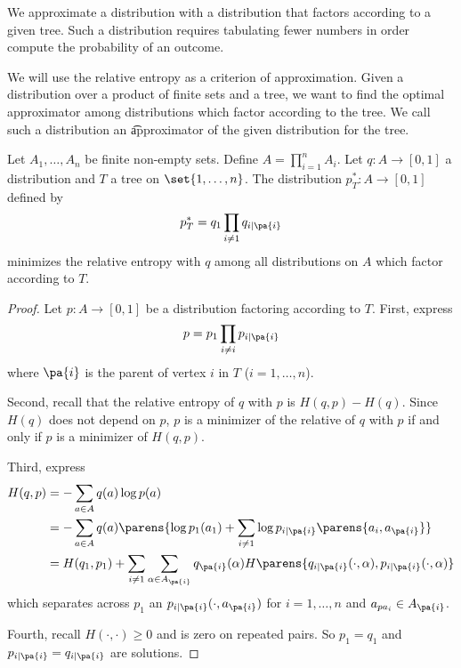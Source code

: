 

We approximate a distribution with a distribution that factors according to a given tree.
Such a distribution requires tabulating fewer numbers in order compute the probability of an outcome.


We will use the relative entropy as a criterion of approximation.
Given a distribution over a product of finite sets and a tree, we want to find the optimal approximator among distributions which factor according to the tree.
We call such a distribution an \t{approximator} of the given distribution for the tree.


\begin{prop}

Let $A_1, \dots, A_n$ be finite non-empty sets.
Define $A = \prod_{i = 1}^{n} A_i$.
Let $q: A \to [0, 1]$ a distribution and $T$ a tree on $\set{1, \dots, n}$.
The distribution $p^*_T: A \to [0, 1]$ defined by
$$
  p^*_T = q_1 \prod_{i \neq 1} q_{i \mid \pa{i}}
$$
minimizes the relative entropy with $q$ among all distributions on $A$ which factor according to $T$.

\begin{proof}

Let $p: A \to [0, 1]$ be a distribution factoring according to $T$. First, express
$$
  p = p_1 \prod_{i \neq i} p_{i \mid \pa{i}}
$$
where $\pa{i}$ is the parent of vertex $i$ in $T$ ($i = 1, \dots, n$).

Second, recall that the relative entropy of $q$ with $p$ is $H(q, p) - H(q)$.
Since $H(q)$ does not depend on $p$, $p$ is a minimizer of the relative of $q$ with $p$ if and only if $p$ is a minimizer of $H(q, p)$.

Third, express
$$
\begin{aligned}
  H(q, p) &= - \sum_{a \in A} q(a) \log p(a) \\
          &= - \sum_{a \in A} q(a) \parens{\log p_1(a_1) + \sum_{i \neq 1} \log p_{i \mid \pa{i}}\parens{a_i, a_{\pa{i}}}} \\
          &= H(q_1, p_1) + \sum_{i \neq 1} \sum_{\alpha \in A_{\pa{i}}} q_{\pa{i}}(\alpha)H\parens{q_{i\mid\pa{i}}(\cdot, \alpha), p_{i\mid\pa{i}}(\cdot, \alpha)}
\end{aligned}
$$
  which separates across $p_1$ an $p_{i \mid \pa{i}}(\cdot, a_{\pa{i}})$ for $i = 1, \dots, n$ and $a_{pa_{i}} \in A_{\pa{i}}$.

Fourth, recall $H(\cdot, \cdot) \geq 0$ and is zero on repeated pairs.
So $p_1 = q_1$ and $p_{i \mid \pa{i}} = q_{i \mid \pa{i}}$ are solutions.

\end{proof}

\end{prop}

%
